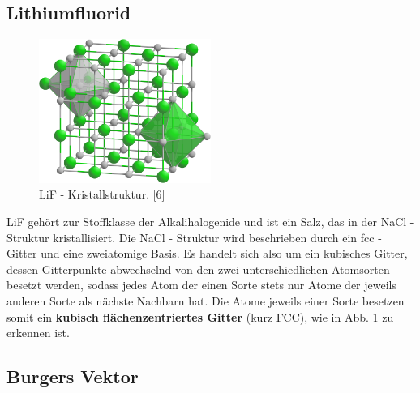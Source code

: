     \subsection{Lithiumfluorid}
	\begin{figure}[H]
            \centering
            \includegraphics[width=0.5\textwidth]{Images/LiF.PNG}
            \caption{LiF - Kristallstruktur. [6]}
            \label{FigLiF}
        \end{figure}
	LiF gehört zur Stoffklasse der Alkalihalogenide und ist ein Salz, das in der NaCl - Struktur kristallisiert. Die NaCl - Struktur wird beschrieben durch ein fcc - Gitter und eine
	zweiatomige Basis. Es handelt sich also um ein kubisches Gitter, dessen Gitterpunkte
	abwechselnd von den zwei unterschiedlichen Atomsorten besetzt werden, sodass jedes Atom der einen Sorte stets nur Atome der jeweils anderen Sorte als nächste Nachbarn hat.
	Die Atome jeweils einer Sorte besetzen somit ein \textbf{kubisch flächenzentriertes Gitter} (kurz FCC), wie in Abb. \ref{FigLiF} zu erkennen ist. 


    \subsection{Burgers Vektor}

